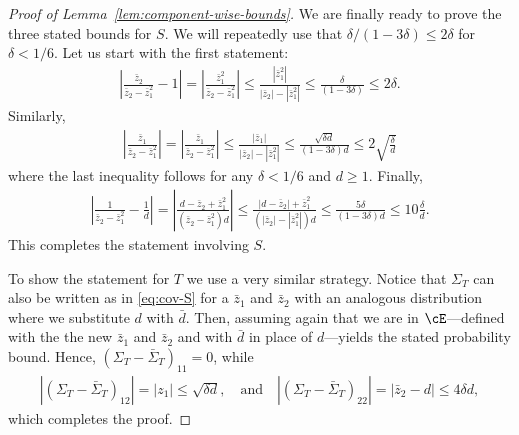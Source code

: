\begin{proof}[Proof of Lemma~\ref{lem:component-wise-bounds}]
 We are finally ready to prove the three stated bounds for $S$. We will repeatedly use that $\delta/(1-3\delta) \leq 2 \delta$ for $\delta < 1/6.$ Let us start with the first statement:
    \begin{align*}
       \left| \frac{\bar z_2}{\bar z_2 - \bar z_1^2} -1\right|= \left| \frac{\bar z_1^2}{\bar z_2 - \bar z_1^2}\right| \leq \frac{|\bar z_1^2|}{|\bar z_2| - |\bar z_1^2|} \leq \frac{\delta }{(1-3\delta)} \leq 2 \delta.
    \end{align*}
 Similarly,
    \begin{align*}
       \left| \frac{\bar z_1}{\bar z_2 - \bar z_1^2}\right|= \left| \frac{\bar z_1}{\bar z_2 - \bar z_1^2}\right| \leq \frac{|\bar z_1|}{|\bar z_2| - |\bar z_1^2|} \leq \frac{\sqrt{\delta d}}{(1-3\delta) d} \leq 2\sqrt{\frac{\delta}{d}}
    \end{align*}
    where the last inequality follows for any $\delta < 1/6$ and $d \geq 1.$ Finally, 
\begin{align*}
    \left|\frac{1}{\bar z_2 - \bar z_1^2} - \frac{1}{d} \right| = \left| \frac{d - \bar z_2 + \bar z_1^2}{(\bar z_2 - \bar z_1^2) d}\right| \leq \frac{|d - \bar z_2| + \bar z_1^2}{(|\bar z_2| - |\bar z_1^2|) d } \leq \frac{5 \delta }{(1-3\delta)d} \leq 10 \frac{\delta}{d}.
\end{align*}
This completes the statement involving $S$. 

To show the statement for $T$ we use a very similar strategy. Notice that $\Sigma_T$ can also be written as in \eqref{eq:cov-S} for a $\bar z_1$ and $\bar z_2$ with an analogous distribution where we substitute $d$ with $\bar d.$ Then, assuming again that we are in $\cE$---defined with the the new $\bar z_1$ and $\bar z_2$ and with $\bar d$ in place of $d$---yields the stated probability bound. Hence, $\left(\Sigma_T - \bar \Sigma_T \right)_{11} = 0 $, while 
\begin{align*}
\left|\left(\Sigma_T - \bar \Sigma_T \right)_{12}\right| = |z_1| \leq \sqrt{\delta d}, \quad \text{and} \quad \left|\left(\Sigma_T - \bar \Sigma_T \right)_{22}\right| = |\bar z_2 - d| \leq 4 \delta d,
\end{align*}
which completes the proof.
\end{proof}

